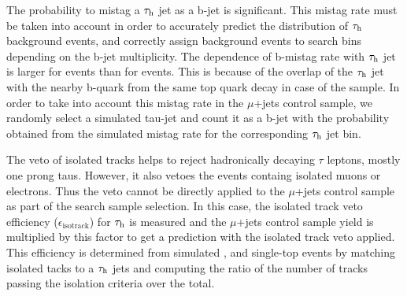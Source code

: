 The probability to mistag a $\tau_\mathrm{h}$ jet as a b-jet is significant.
%
This mistag rate must be taken into account in order to accurately predict the \nbjets distribution of $\tau_\mathrm{h}$ background events, and correctly assign \tauh background events to search bins depending on the b-jet multiplicity. 
%
The dependence of b-mistag rate with $\tau_\mathrm{h}$ jet \pt is larger for \ttbar events than for \wpj events. 
%
This is because of the overlap of the $\tau_\mathrm{h}$ jet with the nearby b-quark from the same top quark decay in case of the \ttbar sample. 
%
In order to take into account this mistag rate in the $\mu$+jets control sample, we randomly select a simulated tau-jet and count it as a b-jet with the probability obtained from the simulated mistag rate \wpj for the corresponding $\tau_\mathrm{h}$ jet \pt bin.

The veto of isolated tracks helps to reject hadronically decaying $\tau$ leptons, mostly one prong taus. 
%
However, it also vetoes the events containg isolated muons or electrons.
%
Thus the veto cannot be directly applied to the $\mu$+jets control sample as part of the search sample selection. 
%
In this case, the isolated track veto efficiency ($\epsilon_\text{isotrack}$) for $\tau_\mathrm{h}$ is measured and the  $\mu$+jets control sample yield is multiplied by this factor to get a prediction with the isolated track veto applied. 
%
This efficiency is determined from simulated \ttbar, \wpj and single-top events by matching isolated tacks to a $\tau_\mathrm{h}$ jets and computing the ratio of the number of tracks passing the isolation criteria over the total.

